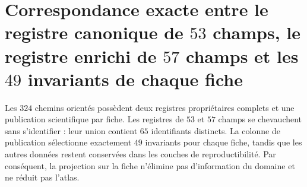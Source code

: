 \section{Correspondance exacte entre le registre canonique de \(53\) champs, le registre enrichi de \(57\) champs et les \(49\) invariants de chaque fiche}
\label{sec:correspondencia-atlas-53-57-49-sucesor}

Les \(324\) chemins orientés possèdent deux registres propriétaires complets et
une publication scientifique par fiche. Les registres de \(53\) et \(57\)
champs se chevauchent sans s'identifier : leur union contient \(65\) identifiants
distincts. La colonne de publication sélectionne exactement \(49\) invariants
pour chaque fiche, tandis que les autres données restent conservées dans les
couches de reproductibilité. Par conséquent, la projection sur la fiche n'élimine pas
d'information du domaine et ne réduit pas l'atlas.

